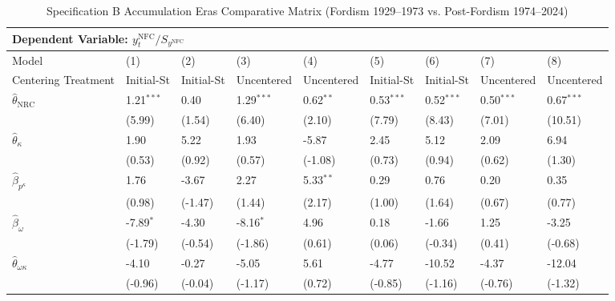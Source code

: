 \begin{landscape}
\begin{table}[H]
\centering
\caption{Specification B Accumulation Eras Comparative Matrix (Fordism 1929--1973 vs. Post-Fordism 1974--2024)}
\label{tab:specB_eras}
\small
\begin{tabular}{p{5.0cm}p{1.5cm}p{1.5cm}p{1.5cm}p{1.5cm}p{1.5cm}p{1.5cm}p{1.5cm}p{1.5cm}}
\toprule
\multicolumn{9}{l}{\textbf{Dependent Variable: $y_t^{\text{NFC}} / S_{y^{\text{NFC}}}$}} \\
\midrule
Model & (1) & (2) & (3) & (4) & (5) & (6) & (7) & (8)  \\
Centering Treatment & Initial-St & Initial-St & Uncentered & Uncentered & Initial-St & Initial-St & Uncentered & Uncentered  \\
\midrule
$\hat{\theta}_{\text{NRC}}$ & 1.21$^{***}$ & 0.40 & 1.29$^{***}$ & 0.62$^{**}$ & 0.53$^{***}$ & 0.52$^{***}$ & 0.50$^{***}$ & 0.67$^{***}$  \\
 & {\scriptsize (5.99)} & {\scriptsize (1.54)} & {\scriptsize (6.40)} & {\scriptsize (2.10)} & {\scriptsize (7.79)} & {\scriptsize (8.43)} & {\scriptsize (7.01)} & {\scriptsize (10.51)}  \\
$\hat{\theta}_{\kappa}$ & 1.90 & 5.22 & 1.93 & -5.87 & 2.45 & 5.12 & 2.09 & 6.94  \\
 & {\scriptsize (0.53)} & {\scriptsize (0.92)} & {\scriptsize (0.57)} & {\scriptsize (-1.08)} & {\scriptsize (0.73)} & {\scriptsize (0.94)} & {\scriptsize (0.62)} & {\scriptsize (1.30)}  \\
$\hat{\beta}_{p^{\kappa}}$ & 1.76 & -3.67 & 2.27 & 5.33$^{**}$ & 0.29 & 0.76 & 0.20 & 0.35  \\
 & {\scriptsize (0.98)} & {\scriptsize (-1.47)} & {\scriptsize (1.44)} & {\scriptsize (2.17)} & {\scriptsize (1.00)} & {\scriptsize (1.64)} & {\scriptsize (0.67)} & {\scriptsize (0.77)}  \\
$\hat{\beta}_{\omega}$ & -7.89$^{*}$ & -4.30 & -8.16$^{*}$ & 4.96 & 0.18 & -1.66 & 1.25 & -3.25  \\
 & {\scriptsize (-1.79)} & {\scriptsize (-0.54)} & {\scriptsize (-1.86)} & {\scriptsize (0.61)} & {\scriptsize (0.06)} & {\scriptsize (-0.34)} & {\scriptsize (0.41)} & {\scriptsize (-0.68)}  \\
$\hat{\theta}_{\omega \kappa}$ & -4.10 & -0.27 & -5.05 & 5.61 & -4.77 & -10.52 & -4.37 & -12.04  \\
 & {\scriptsize (-0.96)} & {\scriptsize (-0.04)} & {\scriptsize (-1.17)} & {\scriptsize (0.72)} & {\scriptsize (-0.85)} & {\scriptsize (-1.16)} & {\scriptsize (-0.76)} & {\scriptsize (-1.32)}  \\

\end{tabular}
\end{table}
\end{landscape}
